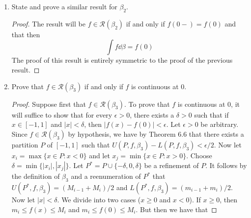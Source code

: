 \documentclass[../psets.tex]{subfiles}
\begin{document}
\begin{enumerate}[label={\textbf{\arabic*.}}]
\begin{enumerate}
\begin{proof}
            as desired.\par
            As to proving that $\int f\dd{\beta_1}$, we know that $M_2\leq f(0)+\epsilon/3$ for arbitrarily small $\epsilon$ implies $M_2\leq f(0)$. Similarly, $m_2\geq f(0)$. Thus,
            \begin{equation*}
                \inf U(P,f,\beta_1) \leq U(P,f,\beta_1)
                = M_2
                \leq f(0)
                \leq m_2
                = L(P,f,\beta_1)
                \leq \sup L(P,f,\beta_1)
            \end{equation*}
            But by Theorem 6.5, $\sup L(P,f,\beta_1)\leq\inf U(P,f,\beta_1)$. Therefore,
            \begin{equation*}
                \int_{-1}^1f\dd{\beta_1} = \sup L(P,f,\beta_1) = \inf U(P,f,\beta_1) = f(0)
            \end{equation*}
            as desired.
        \end{proof}
        \item State and prove a similar result for $\beta_2$.
        \begin{proof}
            The result will be $f\in\mathscr{R}(\beta_2)$ if and only if $f(0-)=f(0)$ and that then
            \begin{equation*}
                \int f\dd{\beta} = f(0)
            \end{equation*}
            The proof of this result is entirely symmetric to the proof of the previous result.
        \end{proof}
        \item Prove that $f\in\mathscr{R}(\beta_3)$ if and only if $f$ is continuous at 0.
        \begin{proof}
            Suppose first that $f\in\mathscr{R}(\beta_3)$. To prove that $f$ is continuous at 0, it will suffice to show that for every $\epsilon>0$, there exists a $\delta>0$ such that if $x\in[-1,1]$ and $|x|<\delta$, then $|f(x)-f(0)|<\epsilon$. Let $\epsilon>0$ be arbitrary. Since $f\in\mathscr{R}(\beta_3)$ by hypothesis, we have by Theorem 6.6 that there exists a partition $P$ of $[-1,1]$ such that $U(P,f,\beta_3)-L(P,f,\beta_3)<\epsilon/2$. Now let $x_i=\max\{x\in P:x<0\}$ and let $x_j=\min\{x\in P:x>0\}$. Choose $\delta=\min\{|x_i|,|x_j|\}$. Let $P^*=P\cup\{-\delta,0,\delta\}$ be a refinement of $P$. It follows by the definition of $\beta_3$ and a reenumeration of $P^*$ that $U(P^*,f,\beta_3)=(M_{i-1}+M_i)/2$ and $L(P^*,f,\beta_3)=(m_{i-1}+m_i)/2$. Now let $|x|<\delta$. We divide into two cases ($x\geq 0$ and $x<0$). If $x\geq 0$, then $m_i\leq f(x)\leq M_i$ and $m_i\leq f(0)\leq M_i$. But then we have that

\end{proof}
\end{enumerate}
\end{enumerate}
\end{document}
